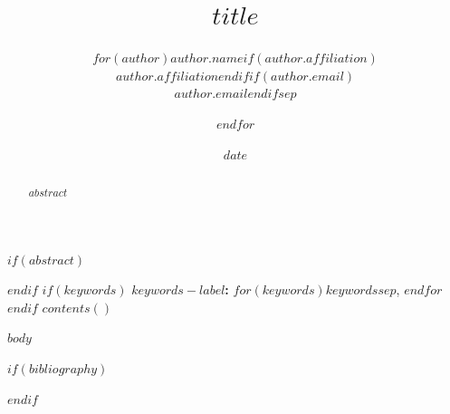 \documentclass[$for(classoption)$$classoption$$sep$,$endfor$]{article}
\title{$title$}
\author{$for(author)$$author.name$$if(author.affiliation)$\\{\small $author.affiliation$}$endif$$if(author.email)$\\{\small\texttt{$author.email$}}$endif$$sep$ \and $endfor$}
\date{$date$}
\begin{document}
\maketitle
$if(abstract)$
\begin{abstract}
$abstract$
\end{abstract}
$endif$
$if(keywords)$
\noindent\textbf{$keywords-label$:} $for(keywords)$$keywords$$sep$, $endfor$
$endif$
$contents()$

$body$

$if(bibliography)$


$endif$
\end{document}
